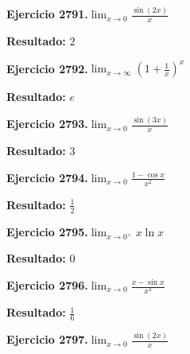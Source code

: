 \documentclass[10pt,a4paper]{article}
\begin{document}
\begin{ejbox}
\textbf{Ejercicio 2791.}\quad $\lim_{x\to 0} \frac{\sin(2x)}{x}$
\end{ejbox}

\begin{solbox}
\textbf{Resultado:} \(\displaystyle 2\)
\end{solbox}

\begin{ejbox}
\textbf{Ejercicio 2792.}\quad $\lim_{x\to \infty} \left(1+\frac{1}{x}\right)^x$
\end{ejbox}

\begin{solbox}
\textbf{Resultado:} \(\displaystyle e\)
\end{solbox}

\newpage
\begin{ejbox}
\textbf{Ejercicio 2793.}\quad $\lim_{x\to 0} \frac{\sin(3x)}{x}$
\end{ejbox}

\begin{solbox}
\textbf{Resultado:} \(\displaystyle 3\)
\end{solbox}

\begin{ejbox}
\textbf{Ejercicio 2794.}\quad $\lim_{x\to 0} \frac{1-\cos x}{x^2}$
\end{ejbox}

\begin{solbox}
\textbf{Resultado:} \(\displaystyle \frac{1}{2}\)
\end{solbox}

\begin{ejbox}
\textbf{Ejercicio 2795.}\quad $\lim_{x\to 0^+} x\ln x$
\end{ejbox}

\begin{solbox}
\textbf{Resultado:} \(\displaystyle 0\)
\end{solbox}

\newpage
\begin{ejbox}
\textbf{Ejercicio 2796.}\quad $\lim_{x\to 0} \frac{x-\sin x}{x^3}$
\end{ejbox}

\begin{solbox}
\textbf{Resultado:} \(\displaystyle \frac{1}{6}\)
\end{solbox}

\begin{ejbox}
\textbf{Ejercicio 2797.}\quad $\lim_{x\to 0} \frac{\sin(2x)}{x}$
\end{ejbox}
\end{document}
